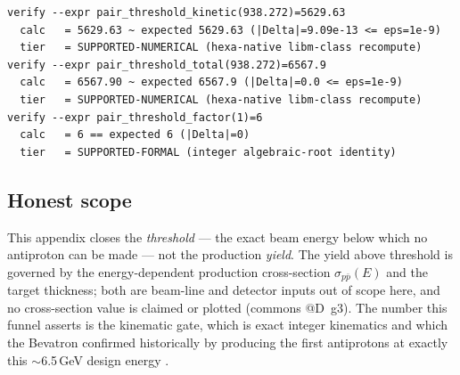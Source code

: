 \begin{lstlisting}
verify --expr pair_threshold_kinetic(938.272)=5629.63
  calc   = 5629.63 ~ expected 5629.63 (|Delta|=9.09e-13 <= eps=1e-9)
  tier   = SUPPORTED-NUMERICAL (hexa-native libm-class recompute)
verify --expr pair_threshold_total(938.272)=6567.9
  calc   = 6567.90 ~ expected 6567.9 (|Delta|=0.0 <= eps=1e-9)
  tier   = SUPPORTED-NUMERICAL (hexa-native libm-class recompute)
verify --expr pair_threshold_factor(1)=6
  calc   = 6 == expected 6 (|Delta|=0)
  tier   = SUPPORTED-FORMAL (integer algebraic-root identity)
\end{lstlisting}

\subsection{Honest scope}
\label{app:prod-scope}

This appendix closes the \emph{threshold} --- the exact beam energy below
which no antiproton can be made --- not the production \emph{yield}. The
yield above threshold is governed by the energy-dependent production
cross-section $\sigma_{p\bar p}(E)$ and the target thickness; both are
beam-line and detector inputs out of scope here, and no cross-section value
is claimed or plotted (commons @D~g3). The number this funnel asserts is the
kinematic gate, which is exact integer kinematics and which the Bevatron
confirmed historically by producing the first antiprotons at exactly this
$\sim$6.5\,GeV design energy \citep{chamberlain1955}.
